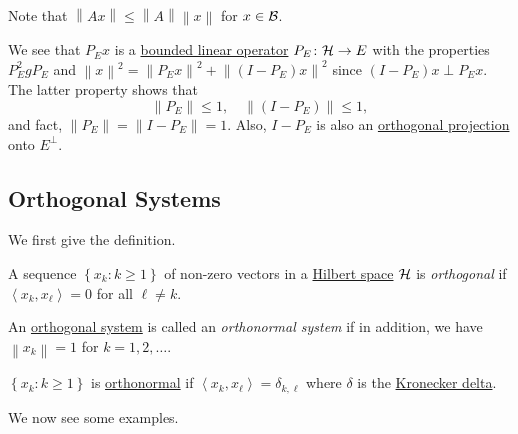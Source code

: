 \begin{remark}
	Note that \(\left\lVert Ax\right\rVert \leq \left\lVert A\right\rVert \left\lVert x\right\rVert \) for \(x\in \mathcal{\MakeUppercase{b}} \).
\end{remark}

We see that \(P_E x\) is a \hyperref[def:bounded-linear-map]{bounded linear operator} \(P_E\colon \mathcal{\MakeUppercase{h}} \to E\) with the properties \(P^{2} _E g P_E\) and \(\left\lVert x\right\rVert ^{2} = \left\lVert P_E x\right\rVert ^{2} + \left\lVert (I - P_E)x\right\rVert ^{2} \) since \((I - P_E)x\perp P_E x\). The latter property shows that
\[
	\left\lVert P_E\right\rVert \leq 1,\quad \left\lVert (I - P_E)\right\rVert \leq 1,
\]
and fact, \(\left\lVert P_E\right\rVert = \left\lVert I-P_E\right\rVert = 1\). Also, \(I - P_E\) is also an \hyperref[def:orthogonal-projection]{orthogonal projection} onto \(E^\perp\).

\subsection{Orthogonal Systems}

We first give the definition.

\begin{definition}\label{def:orthogonal-system}
	A sequence \(\left\{ x_{k} \colon k\geq 1 \right\} \) of non-zero vectors in a \hyperref[def:Hilbert-space]{Hilbert space} \(\mathcal{\MakeUppercase{h}} \) is \emph{orthogonal} if \(\left\langle x_{k} , x_{\ell} \right\rangle = 0\) for all \(\ell \neq k\).
\end{definition}

\begin{definition}\label{def:orthonormal-system}
	An \hyperref[def:orthogonal-system]{orthogonal system} is called an \emph{orthonormal system} if in addition, we have \(\left\lVert x_{k} \right\rVert= 1 \) for \(k = 1, 2, \ldots  \).
\end{definition}

\begin{remark}
	\(\left\{ x_{k} \colon k\geq 1 \right\} \) is \hyperref[def:orthonormal-system]{orthonormal} if \(\left\langle x_{k} , x_{\ell } \right\rangle = \delta _{k, \ell } \) where \(\delta \) is the \href{https://en.wikipedia.org/wiki/Kronecker_delta}{Kronecker delta}.
\end{remark}

We now see some examples.

